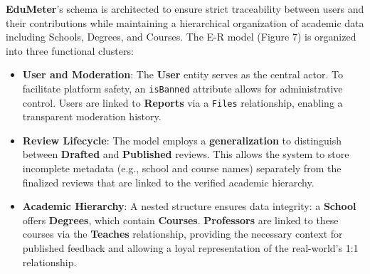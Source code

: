 \textbf{EduMeter}'s schema is architected to ensure strict traceability between users and their contributions while maintaining a hierarchical organization of academic data including Schools, Degrees, and Courses. The E-R model (Figure 7) is organized into three functional clusters:

\begin{itemize}
	\item \textbf{User and Moderation}: The \textbf{User} entity serves as the central actor. To facilitate platform safety, an \texttt{isBanned} attribute allows for administrative control. Users are linked to \textbf{Reports} via a \texttt{Files} relationship, enabling a transparent moderation history.
	\item \textbf{Review Lifecycle}: The model employs a \textbf{generalization} to distinguish between \textbf{Drafted} and \textbf{Published} reviews. This allows the system to store incomplete metadata (e.g., school and course names) separately from the finalized reviews that are linked to the verified academic hierarchy.
	\item \textbf{Academic Hierarchy}: A nested structure ensures data integrity: a \textbf{School} offers \textbf{Degrees}, which contain \textbf{Courses}. \textbf{Professors} are linked to these courses via the \textbf{Teaches} relationship, providing the necessary context for published feedback and allowing a loyal representation of the real-world's 1:1 relationship.
\end{itemize}

